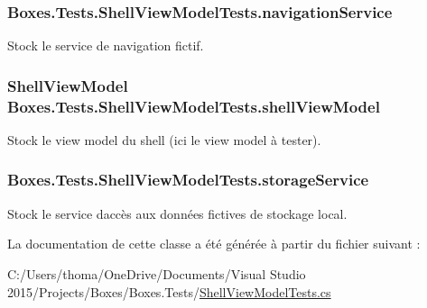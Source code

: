 \subsubsection[{\texorpdfstring{navigation\+Service}{navigationService}}]{ Boxes.\+Tests.\+Shell\+View\+Model\+Tests.\+navigation\+Service\hspace{0.3cm}{\ttfamily [private]}}\hypertarget{class_boxes_1_1_tests_1_1_shell_view_model_tests_ad61de5963310e8d3de06995d7186e5b5}{}\label{class_boxes_1_1_tests_1_1_shell_view_model_tests_ad61de5963310e8d3de06995d7186e5b5}


Stock le service de navigation fictif. 

\subsubsection[{\texorpdfstring{shell\+View\+Model}{shellViewModel}}]{\setlength{\rightskip}{0pt plus 5cm}Shell\+View\+Model Boxes.\+Tests.\+Shell\+View\+Model\+Tests.\+shell\+View\+Model\hspace{0.3cm}{\ttfamily [private]}}\hypertarget{class_boxes_1_1_tests_1_1_shell_view_model_tests_a1789e91b13033d118335621e54940a16}{}\label{class_boxes_1_1_tests_1_1_shell_view_model_tests_a1789e91b13033d118335621e54940a16}


Stock le view model du shell (ici le view model à tester). 

\subsubsection[{\texorpdfstring{storage\+Service}{storageService}}]{ Boxes.\+Tests.\+Shell\+View\+Model\+Tests.\+storage\+Service\hspace{0.3cm}{\ttfamily [private]}}\hypertarget{class_boxes_1_1_tests_1_1_shell_view_model_tests_a522dc3fa1aceb357d0e3c133d27f11b5}{}\label{class_boxes_1_1_tests_1_1_shell_view_model_tests_a522dc3fa1aceb357d0e3c133d27f11b5}


Stock le service d\textquotesingle{}accès aux données fictives de stockage local. 



La documentation de cette classe a été générée à partir du fichier suivant \+:\begin{DoxyCompactItemize}
\item 
C\+:/\+Users/thoma/\+One\+Drive/\+Documents/\+Visual Studio 2015/\+Projects/\+Boxes/\+Boxes.\+Tests/\hyperlink{_shell_view_model_tests_8cs}{Shell\+View\+Model\+Tests.\+cs}\end{DoxyCompactItemize}
